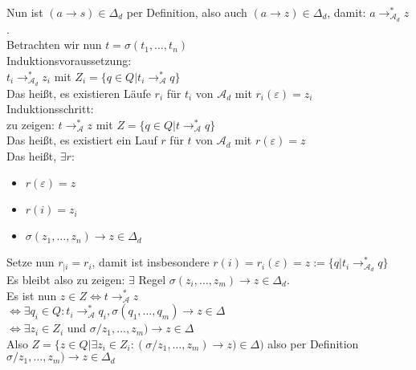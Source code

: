 \documentclass[titlepage]{article}
\begin{document}
Nun ist $( a \rightarrow s) \in \Delta_d$ per Definition, also auch 
$( a \rightarrow z) \in \Delta_d$, damit: $a \rightarrow ^\ast_{\mathcal{A}_d} z$.\\

Betrachten wir nun $ t = \sigma(t_1, \dots , t_n) $ \\

Induktionsvoraussetzung:\\
$t_i \rightarrow ^\ast_{\mathcal{A}_d} z_i$ mit $Z_i = 
\{q \in Q | t_i \rightarrow ^\ast_\mathcal{A} q\}$\\
Das hei\ss t, es existieren L\"aufe $r_i$ f\"ur $t_i$ von $\mathcal{A}_d$ mit 
$r_i(\varepsilon) = z_i$\\

Induktionsschritt:\\
zu zeigen: $ t \rightarrow ^\ast_\mathcal{A} z$ mit $Z = 
\{ q \in Q | t \rightarrow ^\ast_\mathcal{A} q \} $ \\
Das hei\ss t, es existiert ein Lauf $r$ f\"ur $t$ von $\mathcal{A}_d$ mit 
$r(\varepsilon) = z$\\
Das hei\ss t, $\exists r :$\\

\begin{itemize}
	\item $r (\varepsilon) = z$
	\item $r (i) = z_i$
	\item $\sigma (z_1, \dots, z_n) \rightarrow z \in \Delta_d$
\end{itemize}

Setze nun $r_{ |i } = r_i$, damit ist insbesondere 
$r(i) = r_i(\varepsilon) = z := \{q | t_i \rightarrow ^\ast_{\mathcal{A}_d} q \}$\\

Es bleibt also zu zeigen: $ \exists$ Regel $\sigma (z_i, \dots, z_m) \rightarrow z 
\in \Delta_d$.\\
Es ist nun $ z \in Z \Leftrightarrow t \rightarrow ^\ast_\mathcal{A} z$ \\
$\Leftrightarrow \exists q_i \in Q: t_i \rightarrow ^\ast_\mathcal{A} q_i, 
\sigma(q_1, \dots, q_m) \rightarrow z \in \Delta$\\
$\Leftrightarrow \exists z_i \in Z_i$ und $\sigma/z_1, \dots , z_m) \rightarrow z 
\in \Delta$ \\
Also $Z= \{z\in Q | \exists z_i \in Z_i : (\sigma/z_1, \dots , z_m) \rightarrow z ) 
\in \Delta)$ also per Definition
$\sigma/z_1, \dots , z_m) \rightarrow z \in \Delta_d$\\ \\
\end{document}
